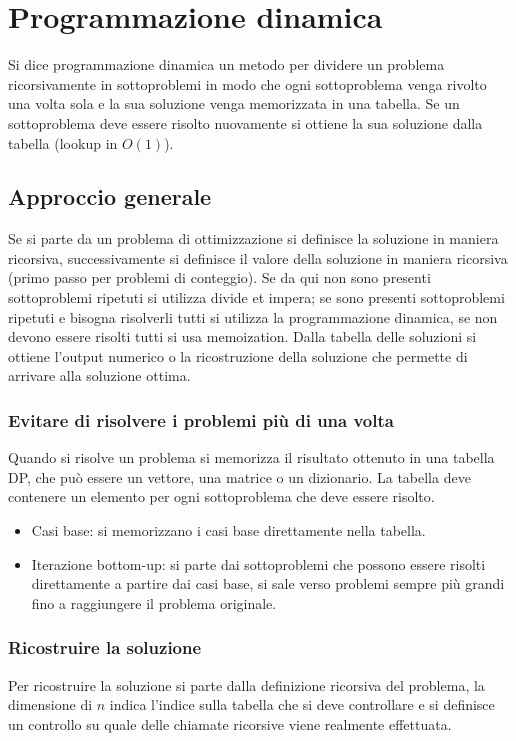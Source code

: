 \chapter{Programmazione dinamica}
Si dice programmazione dinamica un metodo per dividere un problema ricorsivamente in sottoproblemi in modo che ogni sottoproblema venga rivolto una volta sola e la sua soluzione venga memorizzata in
una tabella. Se un sottoproblema deve essere risolto nuovamente si ottiene la sua soluzione dalla tabella (lookup in $O(1)$).
\section{Approccio generale}
Se si parte da un problema di ottimizzazione si definisce la soluzione in maniera ricorsiva, successivamente si definisce il valore della soluzione in maniera ricorsiva (primo passo per problemi di conteggio). Se da
qui non sono presenti sottoproblemi ripetuti si utilizza divide et impera; se sono presenti sottoproblemi ripetuti e bisogna risolverli tutti si utilizza la programmazione dinamica, se non devono essere risolti tutti
si usa memoization. Dalla tabella delle soluzioni si ottiene l'output numerico o la ricostruzione della soluzione che permette di arrivare alla soluzione ottima. 
\subsection{Evitare di risolvere i problemi pi\`u di una volta}
Quando si risolve un problema si memorizza il risultato ottenuto in una tabella DP, che pu\`o essere un vettore, una matrice o un dizionario. La tabella deve contenere un elemento per ogni sottoproblema che
deve essere risolto.
\begin{itemize}
\item Casi base: si memorizzano i casi base direttamente nella tabella.
\item Iterazione bottom-up: si parte dai sottoproblemi che possono essere risolti direttamente a partire dai casi base, si sale verso problemi sempre pi\`u grandi fino a raggiungere il problema originale. 
\end{itemize} 
\subsection{Ricostruire la soluzione}
Per ricostruire la soluzione si parte dalla definizione ricorsiva del problema, la dimensione di $n$ indica l'indice sulla tabella che si deve controllare e si definisce un controllo su quale delle chiamate ricorsive viene
realmente effettuata.
